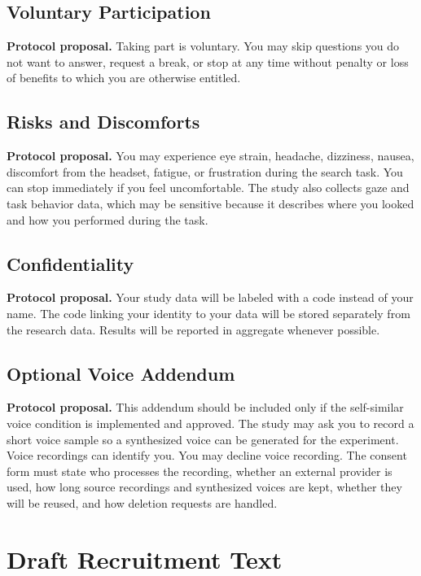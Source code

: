 \documentclass[11pt,letterpaper]{article}
\newcommand{\status}[1]{\textbf{#1.}}
\begin{document}
\subsection{Voluntary Participation}

\status{Protocol proposal} Taking part is voluntary. You may skip questions you do not want to answer, request a break, or stop at any time without penalty or loss of benefits to which you are otherwise entitled.

\subsection{Risks and Discomforts}

\status{Protocol proposal} You may experience eye strain, headache, dizziness, nausea, discomfort from the headset, fatigue, or frustration during the search task. You can stop immediately if you feel uncomfortable. The study also collects gaze and task behavior data, which may be sensitive because it describes where you looked and how you performed during the task.

\subsection{Confidentiality}

\status{Protocol proposal} Your study data will be labeled with a code instead of your name. The code linking your identity to your data will be stored separately from the research data. Results will be reported in aggregate whenever possible.

\subsection{Optional Voice Addendum}

\status{Protocol proposal} This addendum should be included only if the self-similar voice condition is implemented and approved. The study may ask you to record a short voice sample so a synthesized voice can be generated for the experiment. Voice recordings can identify you. You may decline voice recording. The consent form must state who processes the recording, whether an external provider is used, how long source recordings and synthesized voices are kept, whether they will be reused, and how deletion requests are handled.

\section{Draft Recruitment Text}
\end{document}
